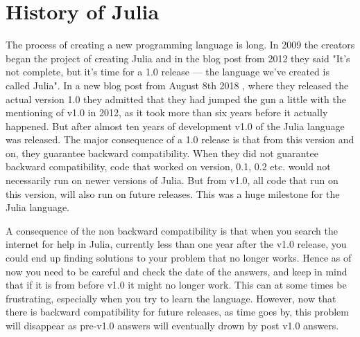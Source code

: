 \section{History of Julia}
The process of creating a new programming language is long. In 2009 the creators began the project of creating Julia and in the blog post \emph{\citep{juliaBlogRelease2012}} from 2012 they said "It’s not complete, but it’s time for a 1.0 release — the language we’ve created is called Julia". In a new blog post from August 8th 2018 \emph{\citep{juliaBlogReleaseV1.0}}, where they released the actual version 1.0 they admitted that they had jumped the gun a little with the mentioning of v1.0 in 2012, as it took more than six years before it actually happened. But after almost ten years of development v1.0 of the Julia language was released. The major consequence of a 1.0 release is that from this version and on, they guarantee backward compatibility. When they did not guarantee backward compatibility, code that worked on version, 0.1, 0.2 etc. would not necessarily run on newer versions of Julia. But from v1.0, all code that run on this version, will also run on future releases. This was a huge milestone for the Julia language. 

A consequence of the non backward compatibility is that when you search the internet for help in Julia, currently less than one year after the v1.0 release, you could end up finding solutions to your problem that no longer works. Hence as of now you need to be careful and check the date of the answers, and keep in mind that if it is from before v1.0 it might no longer work. This can at some times be frustrating, especially when you try to learn the language. However, now that there is backward compatibility for future releases, as time goes by, this problem will disappear as pre-v1.0 answers will eventually drown by post v1.0 answers.

